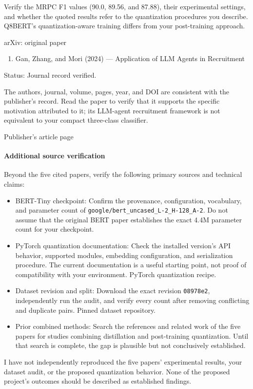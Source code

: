 Verify the MRPC F1 values (90.0, 89.56, and 87.88), their experimental settings, and whether the quoted results refer to the quantization procedures you describe. Q8BERT's quantization-aware training differs from your post-training approach.

arXiv: original paper

\begin{enumerate}
\item Gan, Zhang, and Mori (2024) — Application of LLM Agents in Recruitment
\end{enumerate}
Status: Journal record verified.

The authors, journal, volume, pages, year, and DOI are consistent with the publisher's record. Read the paper to verify that it supports the specific motivation attributed to it; its LLM-agent recruitment framework is not equivalent to your compact three-class classifier.

Publisher's article page

\paragraph*{Additional source verification}
Beyond the five cited papers, verify the following primary sources and technical claims:

\begin{itemize}
\item BERT-Tiny checkpoint: Confirm the provenance, configuration, vocabulary, and parameter count of \texttt{google/bert\_uncased\_L-2\_H-128\_A-2}. Do not assume that the original BERT paper establishes the exact 4.4M parameter count for your checkpoint.
\item PyTorch quantization documentation: Check the installed version's API behavior, supported modules, embedding configuration, and serialization procedure. The current documentation is a useful starting point, not proof of compatibility with your environment. PyTorch quantization recipe.
\item Dataset revision and split: Download the exact revision \texttt{08978e2}, independently run the audit, and verify every count after removing conflicting and duplicate pairs. Pinned dataset repository.
\item Prior combined methods: Search the references and related work of the five papers for studies combining distillation and post-training quantization. Until that search is complete, the gap is plausible but not conclusively established.
\end{itemize}
I have not independently reproduced the five papers' experimental results, your dataset audit, or the proposed quantization behavior. None of the proposed project's outcomes should be described as established findings.

